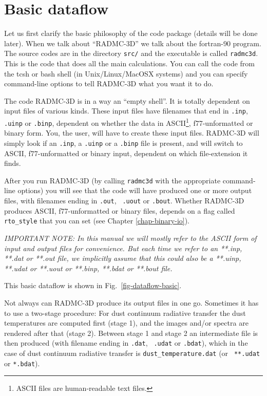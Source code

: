 \documentclass{report}
\begin{document}
\section{Basic dataflow}
\label{sec-dataflow}
%
Let us first clarify the basic philosophy of the code package (details will
be done later). When we talk about ``RADMC-3D'' we talk about the
fortran-90 program. The source codes are in the directory {\small\tt src/}
and the executable is called {\small\tt radmc3d}. This is the code that does
all the main calculations. You can call the code from the tcsh or bash shell
(in Unix/Linux/MacOSX systems) and you can specify command-line options to
tell RADMC-3D what you want it to do.

The code RADMC-3D is in a way an ``empty shell''. It is totally dependent on
input files of various kinds. These input files have filenames that end in
{\small\tt .inp}, {\small\tt .uinp} or {\small\tt .binp}, dependent on
whether the data in ASCII\footnote{ASCII files are human-readable text
  files.}, f77-unformatted or binary form. You, the user, will have to
create these input files. RADMC-3D will simply look if an {\small\tt .inp},
a {\small\tt .uinp} or a {\small\tt .binp} file is present, and will switch
to ASCII, f77-unformatted or binary input, dependent on which file-extension
it finds.

After you run RADMC-3D (by calling {\small\tt radmc3d} with the appropriate
command-line options) you will see that the code will have produced one or
more output files, with filenames ending in {\small\tt .out}, {\small\tt
  .uout} or {\small\tt .bout}. Whether RADMC-3D produces ASCII,
f77-unformatted or binary files, depends on a flag called {\small\tt
  rto\_style} that you can set (see Chapter \ref{chap-binary-io}).

{\em IMPORTANT NOTE: In this manual we will mostly refer to the ASCII form
  of input and output files for convenience. But each time we refer to an
  **.inp, **.dat or **.out file, we implicitly assume that this could also
  be a **.uinp, **.udat or **.uout or **.binp, **.bdat or **.bout file.}

This basic dataflow is shown in Fig.~\ref{fig-dataflow-basic}.

Not always can RADMC-3D produce its output files in one go. Sometimes it has
to use a two-stage procedure: For dust continuum radiative transfer the dust
temperatures are computed first (stage 1), and the images and/or spectra are
rendered after that (stage 2). Between stage 1 and stage 2 an intermediate
file is then produced (with filename ending in {\small\tt .dat}, {\small\tt
  .udat} or {\small\tt .bdat}), which in the case of dust continuum
radiative transfer is {\small\tt dust\_temperature.dat} (or {\small\tt
  **.udat} or {\small\tt **.bdat}).
\end{document}
